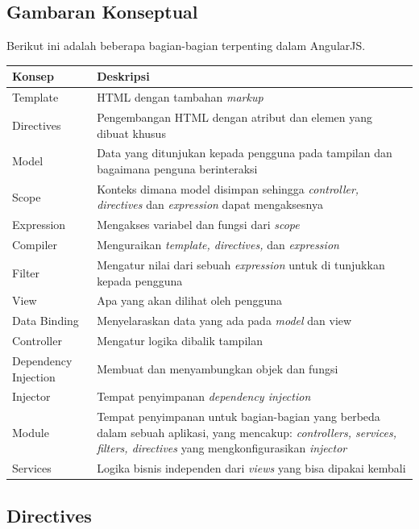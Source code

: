 \subsection{Gambaran Konseptual}
\label{sub: gambaranKonsep}
	Berikut ini adalah beberapa bagian-bagian terpenting dalam AngularJS.
	\begin{center}
		\begin{tabular}{| m{5cm} | m{10cm} |}
			\hline
			Konsep & Deskripsi \\
			\hline
			Template & HTML dengan tambahan \textit{markup} \\
			\hline
			Directives & Pengembangan HTML dengan atribut dan elemen yang dibuat khusus \\
			\hline
			Model & Data yang ditunjukan kepada pengguna pada tampilan dan bagaimana penguna berinteraksi \\
			\hline
			Scope & Konteks dimana model disimpan sehingga \textit{controller, directives} dan \textit{expression} dapat mengaksesnya \\
			\hline
			Expression & Mengakses variabel dan fungsi dari \textit{scope} \\
			\hline
			Compiler & Menguraikan \textit{template, directives,} dan \textit{expression} \\
			\hline
			Filter & Mengatur nilai dari sebuah \textit{expression} untuk di tunjukkan kepada pengguna \\
			\hline
			View & Apa yang akan dilihat oleh pengguna\\
			\hline
			Data Binding & Menyelaraskan data yang ada pada \textit{model} dan view \\
			\hline
			Controller & Mengatur logika dibalik tampilan \\
			\hline
			Dependency Injection & Membuat dan menyambungkan objek dan fungsi \\
			\hline
			Injector & Tempat penyimpanan \textit{dependency injection} \\
			\hline
			Module & Tempat penyimpanan untuk bagian-bagian yang berbeda dalam sebuah aplikasi, yang mencakup: \textit{controllers, services, filters, directives} yang mengkonfigurasikan \textit{injector} \\
			\hline
			Services & Logika bisnis independen dari \textit{views} yang bisa dipakai kembali  \\
			\hline
			\end{tabular}
		\end{center}
		
\subsection{Directives}
\label{sub: directives}

